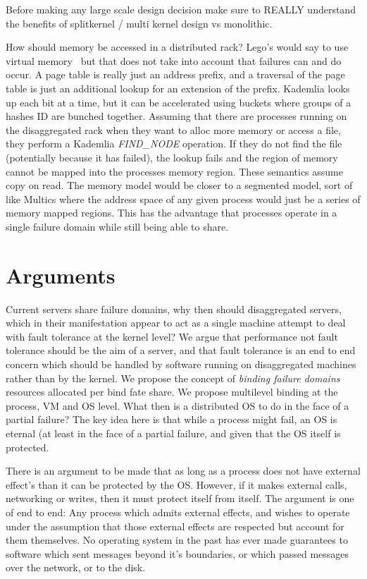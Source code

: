 Before making any large scale design decision make sure to REALLY understand
the benefits of splitkernel / multi kernel design vs monolithic.

How should memory be accessed in a distributed rack? Lego's would say to use
virtual memory~\cite{legoos} but that does not take into account that failures
can and do occur. A page table is really just an address prefix, and a
traversal of the page table is just an additional lookup for an extension of
the prefix. Kademlia looks up each bit at a time, but it can be accelerated
using buckets where groups of a hashes ID are bunched together. Assuming that
there are processes running on the disaggregated rack when they want to alloc
more memory or access a file, they perform a Kademlia \textit{FIND\_NODE}
operation. If they do not find the file (potentially because it has failed),
the lookup fails and the region of memory cannot be mapped into the processes
memory region. These semantics assume copy on read. The memory model would be
closer to a segmented model, sort of like Multics where the address space of
any given process would just be a series of memory mapped regions. This has the
advantage that processes operate in a single failure domain while still being
able to share.

\section{Arguments}
\label{sec:arguments}

Current servers share failure domains, why then should disaggregated servers, which
in their manifestation appear to act as a single machine attempt to deal with
fault tolerance at the kernel level? We argue that performance not fault
tolerance should be the aim of a server, and that fault tolerance is an end to
end concern which should be handled by software running on disaggregated
machines rather than by the kernel. We propose the concept of \textit{binding
failure domains} resources allocated per bind fate share. We propose multilevel
binding at the process, VM and OS level. What then is a distributed OS to do in
the face of a partial failure? The key idea here is that while a process might fail, an OS is eternal (at least in the face of a partial failure, and given that the OS itself is protected.

There is an argument to be made that as long as a process does not have
external effect's than it can be protected by the OS. However, if it makes
external calls, networking or writes, then it must protect itself from itself.
The argument is one of end to end: Any process which admits external effects,
and wishes to operate under the assumption that those external effects are
respected but account for them themselves. No operating system in the past has
ever made guarantees to software which sent messages beyond it's boundaries, or
which passed messages over the network, or to the disk.

